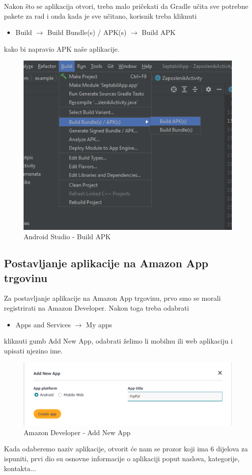 			 Nakon što se aplikacija otvori, treba malo pričekati da Gradle učita sve potrebne pakete za rad i onda kada je sve učitano, korisnik treba kliknuti
			 \begin{itemize}
			  \item Build $\rightarrow$ Build Bundle(s) / APK(s) $\rightarrow$ Build APK \end{itemize}
			  kako bi napravio APK naše aplikacije.
			 \begin{figure}[H]
			 	\centering
			 	\includegraphics[scale=0.55]{./slike/astudio2.png}
			 	\caption{Android Studio - Build APK}
			 	\label{fig:astudio2}
			 \end{figure} 
			
			
			 \subsection{Postavljanje aplikacije na Amazon App trgovinu}  
			 Za postavljanje aplikacije na Amazon App trgovinu, prvo smo se morali registrirati na Amazon Developer.
			 Nakon toga treba odabrati
			 \begin{itemize}
			 	\item  Apps and Services $\rightarrow$ My apps
			 \end{itemize}
			 kliknuti gumb Add New App, 
			 odabrati želimo li mobilnu ili web aplikaciju i\\ upisati njezino ime.
		 	 \begin{figure}[H]
		 	 	\centering
		 	 	\includegraphics[scale=0.55]{./slike/amzn1.png}
		 	 	\caption{Amazon Developer - Add New App}
		 	 	\label{fig:amzn1}
		 	 \end{figure}
	 	 	\eject
	 	 	Kada odaberemo naziv aplikacije, otvorit će nam se prozor koji ima 6 dijelova za ispuniti, prvi dio su osnovne informacije o aplikaciji poput naslova, kategorije, kontakta...
	 	 	
